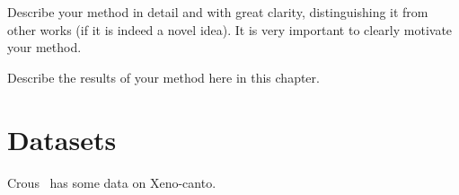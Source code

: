 Describe your method in detail and with great clarity, distinguishing it from
other works (if it is indeed a novel idea). It is very important to clearly
motivate your method.

Describe the results of your method here in this chapter.

\section{Datasets}

Crous~\cite{crous2019polyphonic} has some data on Xeno-canto.
